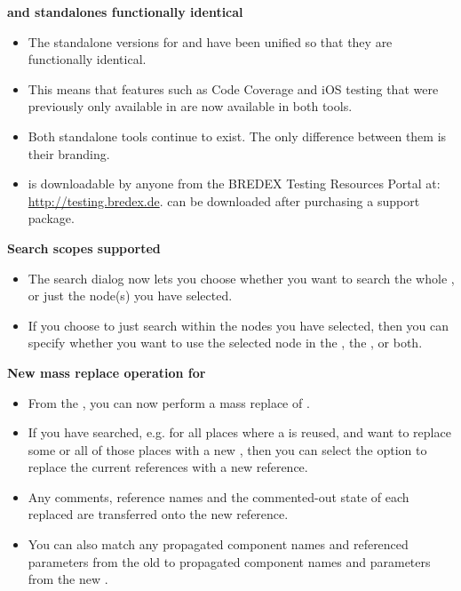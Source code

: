 
\textbf{\jb{} and \gd{} standalones functionally identical}
\begin{itemize}
\item The standalone versions for \jb{} and \gd{} have been unified so that they are functionally identical.
\item This means that features such as Code Coverage and iOS testing that were previously only available in \gd{} are now available in both tools. 
\item Both standalone tools continue to exist. The only difference between them is their branding. 
\item \jb{} is downloadable by anyone from the BREDEX Testing Resources Portal at: \url{http://testing.bredex.de}. \gd{} can be downloaded after purchasing a support package.
\end{itemize}

\textbf{Search scopes supported}
\begin{itemize}
\item The search dialog now lets you choose whether you want to search the whole \gdproject{}, or just the node(s) you have selected. 
\item If you choose to just search within the nodes you have selected, then you can specify whether you want to use the selected node in the \gdtestsuitebrowser{}, the \gdtestcasebrowser{}, or both. 
\end{itemize}

\textbf{New mass replace operation for \gdcases{}}
\begin{itemize}
\item From the \gdsearchresultview{}, you can now perform a mass replace of \gdcases{}. 
\item If you have searched, e.g. for all places where a \gdcase{} is reused, and want to replace some or all of those places with a new \gdcase{}, then you can select the option to replace the current \gdcase{} references with a new \gdcase{} reference. 
\item Any comments, \gdcase{} reference names and the commented-out state of each replaced \gdcase{} are transferred onto the new \gdcase{} reference. 
\item You can also match any propagated component names and referenced parameters from the old \gdcase{} to propagated component names and parameters from the new \gdcase{}. 
\end{itemize}

